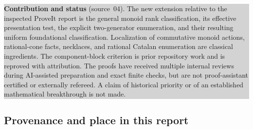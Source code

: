 \documentclass[11pt,letterpaper]{article}
\numberwithin{equation}{section}
\theoremstyle{plain}
\theoremstyle{definition}
\theoremstyle{remark}
\newcommand{\status}[1]{\par\noindent\colorbox{lightgray}{\parbox{\dimexpr\linewidth-2\fboxsep\relax}{#1}}\par}
\begin{document}
\status{\textbf{Contribution and status} (source~04).
The new extension relative to the inspected ProveIt report is the
general monoid rank classification, its effective presentation test,
the explicit two-generator enumeration, and their resulting uniform
foundational classification. Localization of commutative monoid
actions, rational-cone facts, necklaces, and rational Catalan
enumeration are classical ingredients. The component-block criterion
is prior repository work and is reproved with attribution.
The proofs have received multiple internal reviews during AI-assisted
preparation and exact finite checks, but are not proof-assistant
certified or externally refereed. A claim of historical priority or
of an established mathematical breakthrough is not made.}

\subsection{Provenance and place in this report}
\label{nee:aa:sec:provenance}
\end{document}
